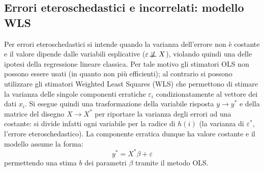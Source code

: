 \documentclass[a4page, 11pt]{article} %
\def\dep{\not\!\perp\!\!\!\perp}
\begin{document}
\subsection*{Errori eteroschedastici e incorrelati: modello WLS}
Per errori eteroschedastici si intende quando la varianza dell’errore non è costante e il valore dipende dalle variabili esplicative ($\varepsilon \dep X$), violando quindi una delle ipotesi della regressione lineare classica.
Per tale motivo gli stimatori OLS non possono essere usati (in quanto non più efficienti); al contrario si possono utilizzare gli stimatori Weighted Least Squares (WLS) che permettono di stimare la varianza delle singole componenti erratiche $\varepsilon_i$ condizionatamente al vettore dei dati $x_i$.
Si esegue quindi una trasformazione della variabile risposta $y \rightarrow y^*$ e della matrice del disegno $X \rightarrow X^*$ per riportare la varianza degli errori ad una costante: si divide infatti ogni variabile per la radice di $h(i)$ (la varianza di $\varepsilon^*$, l'errore eteroschedastico).
La componente erratica dunque ha valore costante e il modello assume la forma:
\begin{equation*}
y^* = X^*\beta + \varepsilon
\end{equation*}
permettendo una stima $b$ dei parametri $\beta$ tramite il metodo OLS.
\end{document}
